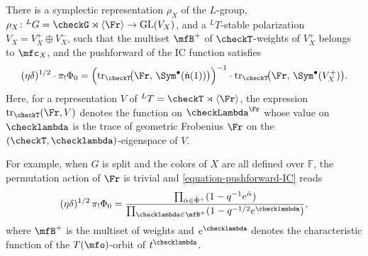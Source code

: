 \begin{conjecture}
  There is a symplectic representation \( \rho_X \) of the \( L \)-group,
  \( \rho_X \colon {}^{L}G = \checkG \rtimes \langle \Fr \rangle \to \mathrm{GL}(V_X) \),
  and a \( {}^{L}T \)-stable polarization \( V_X = V_X^+ \oplus V_X^- \), such that the
  multiset \( \mfB^+ \) of \( \checkT \)-weights of \( V_X^+ \) belongs to \( \mfc_X \),
  and the pushforward of the IC function satisfies
  \begin{equation}
    \label{equation-pushforward-IC}
    (\eta\delta)^{1/2} \cdot \pi_! \Phi_0
      = \Bigl(\mathrm{tr}_{\checkT}\!\bigl(\Fr,\, \Sym^\bullet(\check{\mathfrak{n}}(1))\bigr)
        \Bigr)^{-1}
        \cdot \mathrm{tr}_{\checkT}\!\bigl(\Fr,\, \Sym^\bullet(V_X^+)\bigr).
  \end{equation}
  Here, for a representation \( V \) of \( {}^{L}T = \checkT \rtimes \langle \Fr \rangle \),
  the expression \( \mathrm{tr}_{\checkT}(\Fr, V) \) denotes the function on
  \( \checkLambda^{\Fr} \) whose value on \( \checklambda \) is the trace of geometric
  Frobenius \( \Fr \) on the \( (\checkT, \checklambda) \)-eigenspace of \( V \).

  For example, when \( G \) is split and the colors of \( X \) are all defined over
  \( \mathbb{F} \), the permutation action of \( \Fr \) is trivial and
  \eqref{equation-pushforward-IC} reads
  \begin{equation}
    \label{equation-pushforward-IC-expl}
    (\eta\delta)^{1/2}\, \pi_! \Phi_0
      = \frac{\prod_{\check\alpha \in \check\Phi^+} (1 - q^{-1} e^{\check\alpha})}
             {\prod_{\checklambda \in \mfB^+} (1 - q^{-1/2} e^{\checklambda})},
  \end{equation}
  where \( \mfB^+ \) is the multiset of weights and \( e^{\checklambda} \) denotes the
  characteristic function of the \( T(\mfo) \)-orbit of \( t^{\checklambda} \).
\end{conjecture}


